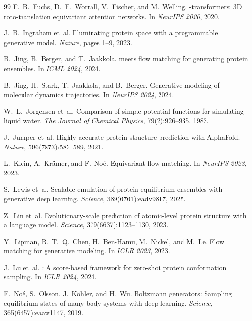 \documentclass[12pt,a4paper]{article}
\begin{document}
\begin{thebibliography}{99}
F.\ B.\ Fuchs, D.\ E.\ Worrall, V.\ Fischer, and M.\ Welling.
-transformers: 3D roto-translation equivariant attention networks.
\newblock In \emph{NeurIPS 2020}, 2020.

J.\ B.\ Ingraham et~al.
\newblock Illuminating protein space with a programmable generative model.
\newblock \emph{Nature}, pages 1--9, 2023.

B.\ Jing, B.\ Berger, and T.\ Jaakkola.
 meets flow matching for generating protein ensembles.
\newblock In \emph{ICML 2024}, 2024.

B.\ Jing, H.\ Stark, T.\ Jaakkola, and B.\ Berger.
\newblock Generative modeling of molecular dynamics trajectories.
\newblock In \emph{NeurIPS 2024}, 2024.

W.\ L.\ Jorgensen et~al.
\newblock Comparison of simple potential functions for simulating liquid water.
\newblock \emph{The Journal of Chemical Physics}, 79(2):926--935, 1983.

J.\ Jumper et~al.
\newblock Highly accurate protein structure prediction with {AlphaFold}.
\newblock \emph{Nature}, 596(7873):583--589, 2021.

L.\ Klein, A.\ Kr\"{a}mer, and F.\ No\'{e}.
\newblock Equivariant flow matching.
\newblock In \emph{NeurIPS 2023}, 2023.

S.\ Lewis et~al.
\newblock Scalable emulation of protein equilibrium ensembles with generative deep learning.
\newblock \emph{Science}, 389(6761):eadv9817, 2025.

Z.\ Lin et~al.
\newblock Evolutionary-scale prediction of atomic-level protein structure with a language model.
\newblock \emph{Science}, 379(6637):1123--1130, 2023.

Y.\ Lipman, R.\ T.\ Q.\ Chen, H.\ Ben-Hamu, M.\ Nickel, and M.\ Le.
\newblock Flow matching for generative modeling.
\newblock In \emph{ICLR 2023}, 2023.

J.\ Lu et~al.
: A score-based framework for zero-shot protein conformation sampling.
\newblock In \emph{ICLR 2024}, 2024.

F.\ No\'{e}, S.\ Olsson, J.\ K\"{o}hler, and H.\ Wu.
\newblock Boltzmann generators: Sampling equilibrium states of many-body systems with deep learning.
\newblock \emph{Science}, 365(6457):eaaw1147, 2019.


\end{thebibliography}
\end{document}
